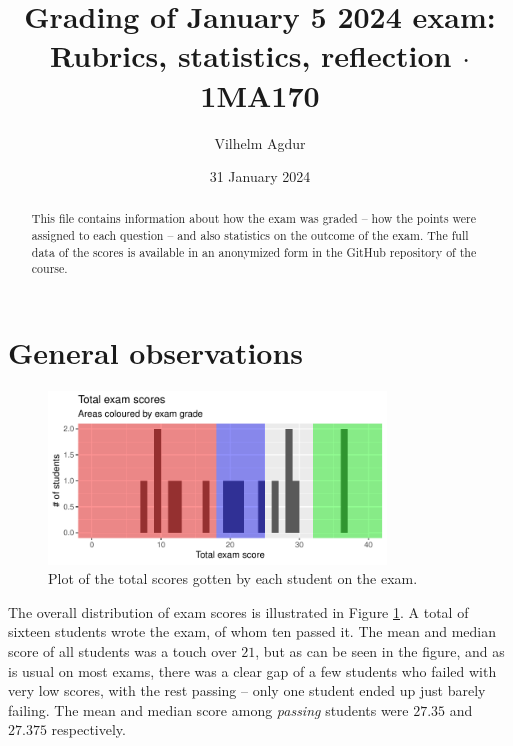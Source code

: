 \documentclass[nobib]{tufte-handout}
\title{Grading of January 5 2024 exam: Rubrics, statistics, reflection $\cdot$ 1MA170}
\author[Vilhelm Agdur]{Vilhelm Agdur}
\date{31 January 2024}
\begin{document}
\maketitle%

\begin{abstract}
\noindent
This file contains information about how the exam was graded -- how the points were assigned to each question -- and also statistics on the outcome of the exam. The full data of the scores is available in an anonymized form in the GitHub repository of the course.
\end{abstract}

\section{General observations}

\begin{figure}
  \centering
  \includegraphics[width = 0.8\textwidth]{totalscore.pdf}
  \caption[Total score figure]{Plot of the total scores gotten by each student on the exam.}
  \label{fig:total_scores}
\end{figure}

The overall distribution of exam scores is illustrated in Figure \ref{fig:total_scores}. A total of sixteen students wrote the exam, of whom ten passed it. The mean and median score of all students was a touch over $21$, but as can be seen in the figure, and as is usual on most exams, there was a clear gap of a few students who failed with very low scores, with the rest passing -- only one student ended up just barely failing. The mean and median score among \emph{passing} students were $27.35$ and $27.375$ respectively.
\end{document}
